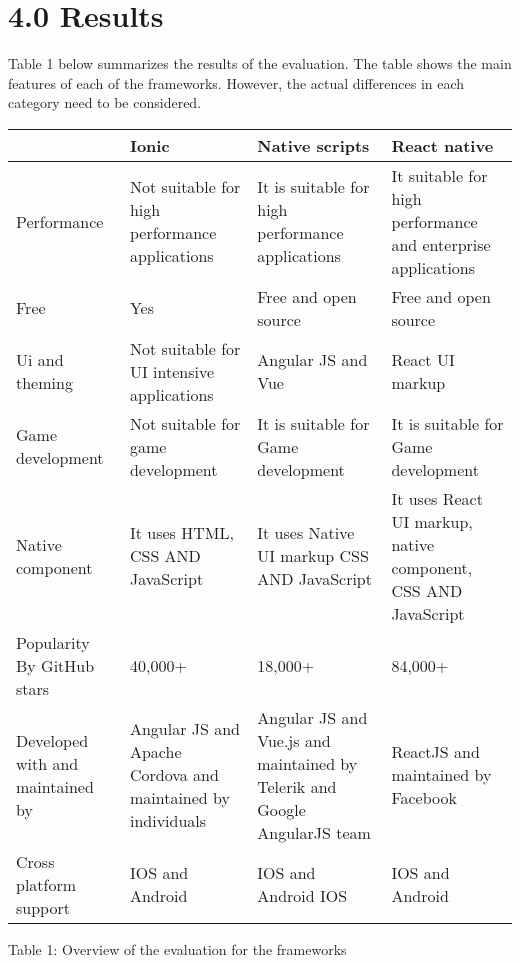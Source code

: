 \documentclass[12pt]{extreport}
\begin{document}
\section*{4.0 Results}
Table 1 below summarizes the results of the evaluation. The table shows the main features of each of the frameworks. However, the actual differences in each category need to be considered.

\begin{table}[!ht]
\begin{adjustwidth}{0in}{0in} %
\centering

\begingroup
\setlength{\tabcolsep}{4pt} %
\renewcommand{\arraystretch}{1.5} %
\begin{tabular}{|p{3cm}|p{4cm}|p{4cm}|p{4cm}|}
	\hline
	& Ionic & Native scripts & React native\\
	\hline
	Performance & Not suitable for high performance applications & It is suitable for high performance applications & It suitable for high performance and enterprise applications\\
	\hline
	Free & Yes & Free and open source & Free and open source\\
	\hline
	Ui and theming & Not suitable for UI intensive applications & Angular JS and Vue
	& React UI markup\\
	\hline
	Game development & Not suitable for game development & It is suitable for Game development & It is suitable for Game development\\
	\hline
	Native component & It uses HTML, CSS AND JavaScript & It uses Native UI markup CSS AND JavaScript & It uses React UI markup, native component, CSS AND JavaScript\\
	\hline
	Popularity By GitHub stars & 40,000+ & 18,000+ & 84,000+\\
	\hline
	Developed with and maintained by & Angular JS and Apache Cordova and maintained by individuals & Angular JS and Vue.js and maintained by Telerik and Google AngularJS team & ReactJS and maintained by Facebook\\
	\hline
	Cross platform support & IOS and Android & IOS and Android IOS & IOS and Android\\
	\hline
	
\end{tabular}
\endgroup

\label{table1}Table 1: Overview of the evaluation for the frameworks
\end{adjustwidth}
\end{table}
\end{document}

